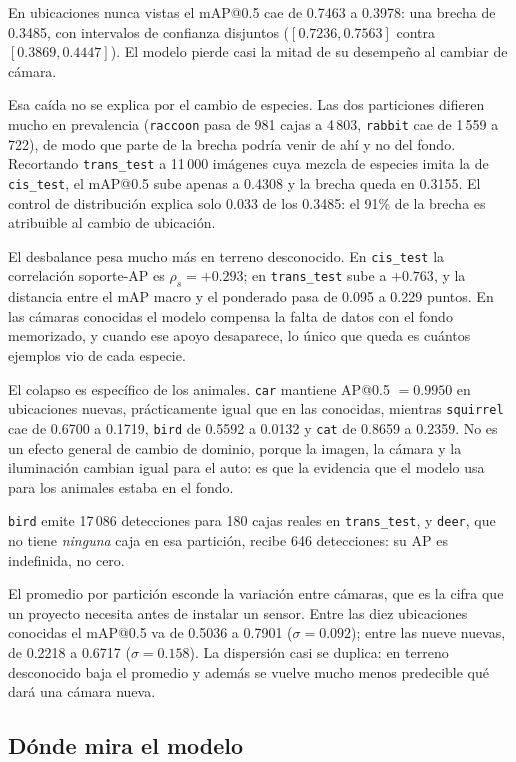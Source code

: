 En ubicaciones nunca vistas el mAP@0.5 cae de 0.7463 a 0.3978: una brecha de
0.3485, con intervalos de confianza disjuntos ($[0.7236, 0.7563]$
contra $[0.3869, 0.4447]$). El modelo pierde casi la mitad de su desempeño al
cambiar de cámara.

Esa caída no se explica por el cambio de especies. Las dos particiones
difieren mucho en prevalencia (\texttt{raccoon} pasa de 981 cajas a 4\,803,
\texttt{rabbit} cae de 1\,559 a 722), de modo que parte de la brecha podría
venir de ahí y no del fondo. Recortando \texttt{trans\_test} a 11\,000 imágenes
cuya mezcla de especies imita la de \texttt{cis\_test}, el mAP@0.5 sube apenas a
0.4308 y la brecha queda en 0.3155. El control de distribución explica
solo 0.033 de los 0.3485: el 91\% de la brecha es atribuible al cambio
de ubicación.

El desbalance pesa mucho más en terreno desconocido. En
\texttt{cis\_test} la correlación soporte-AP es $\rho_s = +0.293$; en
\texttt{trans\_test} sube a $+0.763$, y la distancia entre el mAP macro y el
ponderado pasa de 0.095 a 0.229 puntos. En las cámaras
conocidas el modelo compensa la falta de datos con el fondo memorizado, y cuando
ese apoyo desaparece, lo único que queda es cuántos ejemplos vio de cada especie.

El colapso es específico de los animales. \texttt{car} mantiene AP@0.5
$= 0.9950$ en ubicaciones nuevas, prácticamente igual que en las conocidas,
mientras \texttt{squirrel} cae de 0.6700 a 0.1719, \texttt{bird} de 0.5592 a
0.0132 y \texttt{cat} de 0.8659 a 0.2359. No es un efecto general de cambio de
dominio, porque la imagen, la cámara y la iluminación cambian igual para el auto:
es que la evidencia que el modelo usa para los animales estaba en el fondo.

\texttt{bird} emite 17\,086 detecciones para 180 cajas reales en
\texttt{trans\_test}, y \texttt{deer}, que no tiene \emph{ninguna} caja en esa
partición, recibe 646 detecciones: su AP es indefinida, no cero.

El promedio por partición esconde la variación entre cámaras, que es la cifra
que un proyecto necesita antes de instalar un sensor. Entre las diez
ubicaciones conocidas el mAP@0.5 va de 0.5036 a 0.7901 ($\sigma = 0.092$); entre
las nueve nuevas, de 0.2218 a 0.6717 ($\sigma = 0.158$). La dispersión casi se
duplica: en terreno desconocido baja el promedio y además se vuelve
mucho menos predecible qué dará una cámara nueva.

\subsection{Dónde mira el modelo}
\label{sec:gradcam}

